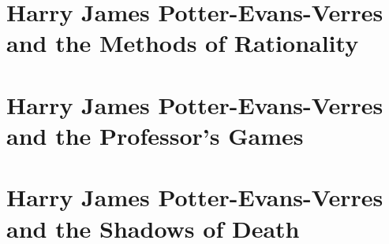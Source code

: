 \RequirePackage{layout/hp-book}



\def\volumenumber{}
\def\volumetitle{chapters 1--122 plus omake files 1--{4}}
\newcommand{\fullvolumetitle}{\volumetitle}




\part{Harry James Potter-Evans-Verres and the Methods of Rationality}





















\part{Harry James Potter-Evans-Verres and the Professor's Games}
















\part{Harry James Potter-Evans-Verres and the Shadows of Death}


























